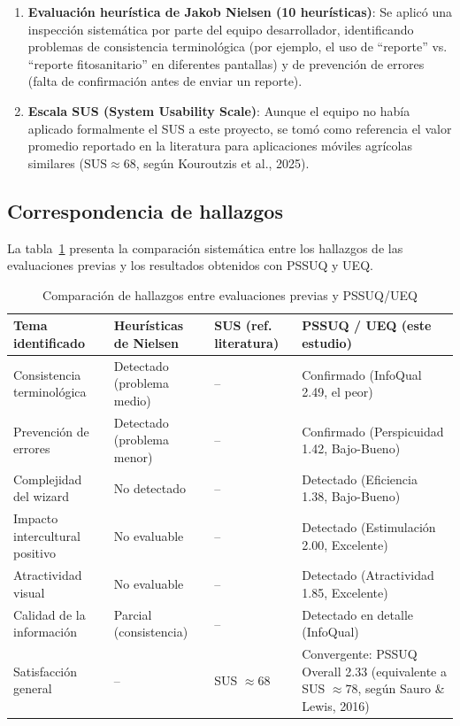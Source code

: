 \documentclass[a4paper,12pt]{report}
\begin{document}
\begin{enumerate}
    \item \textbf{Evaluación heurística de Jakob Nielsen (10 heurísticas)}: Se aplicó una inspección sistemática por parte del equipo desarrollador, identificando problemas de consistencia terminológica (por ejemplo, el uso de ``reporte'' vs. ``reporte fitosanitario'' en diferentes pantallas) y de prevención de errores (falta de confirmación antes de enviar un reporte).

    \item \textbf{Escala SUS (System Usability Scale)}: Aunque el equipo no había aplicado formalmente el SUS a este proyecto, se tomó como referencia el valor promedio reportado en la literatura para aplicaciones móviles agrícolas similares ($\text{SUS} \approx 68$, según Kouroutzis et al., 2025).
\end{enumerate}

\subsection{Correspondencia de hallazgos}

La tabla~\ref{tab:comparacion_metricas} presenta la comparación sistemática entre los hallazgos de las evaluaciones previas y los resultados obtenidos con PSSUQ y UEQ.

\begin{table}[H]
    \centering
    \caption{Comparación de hallazgos entre evaluaciones previas y PSSUQ/UEQ}
    \label{tab:comparacion_metricas}
    \begin{tabular}{p{3.5cm} p{3.5cm} p{3.5cm} p{3.5cm}}
        \toprule
        \textbf{Tema identificado} & \textbf{Heurísticas de Nielsen} & \textbf{SUS (ref. literatura)} & \textbf{PSSUQ / UEQ (este estudio)} \\
        \midrule
        Consistencia terminológica & Detectado (problema medio) & -- & Confirmado (InfoQual 2.49, el peor) \\
        Prevención de errores & Detectado (problema menor) & -- & Confirmado (Perspicuidad 1.42, Bajo-Bueno) \\
        Complejidad del wizard & No detectado & -- & Detectado (Eficiencia 1.38, Bajo-Bueno) \\
        Impacto intercultural positivo & No evaluable & -- & Detectado (Estimulación 2.00, Excelente) \\
        Atractividad visual & No evaluable & -- & Detectado (Atractividad 1.85, Excelente) \\
        Calidad de la información & Parcial (consistencia) & -- & Detectado en detalle (InfoQual) \\
        Satisfacción general & -- & SUS $\approx 68$ & Convergente: PSSUQ Overall 2.33 (equivalente a SUS $\approx 78$, según Sauro \& Lewis, 2016) \\
        \bottomrule
    \end{tabular}
\end{table}
\end{document}
